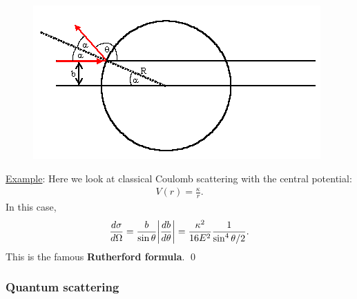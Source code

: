\documentclass{book}
\theoremstyle{definition}
\newcommand{\f}[2]{\frac{#1}{#2}}
\begin{document}
\begin{figure}[!htb]
	\centering
	\includegraphics[scale=0.5]{figures/hard_sphere.png}
\end{figure}



\noindent \underline{Example}: Here we look at classical Coulomb scattering with the central potential:
\begin{align*}
	V(r) = \f{\kappa}{r}.
\end{align*}
In this case, 
\begin{align*}
	\f{d\sigma}{d\Omega} = \f{b}{\sin\theta} \abs{\f{db}{d\theta}} = \f{\kappa^2}{16 E^2} \f{1}{\sin^4 \theta/2}.
\end{align*}
This is the famous \textbf{Rutherford formula}. \qed



\subsubsection{Quantum scattering}
\end{document}
